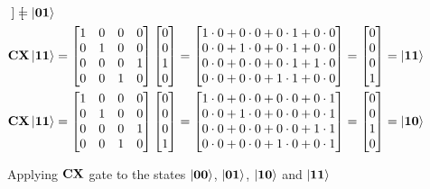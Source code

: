 \begin{figure}[H]
\begin{align*}
\begin{bmatrix}
        \end{bmatrix}
        =\ket{\mathbf{0}\mathbf{1}}\\
        \mathbf{CX}\ket{\mathbf{1}\mathbf{1}}&=\begin{bmatrix} 1 & 0 & 0 & 0\\ 0 & 1 & 0 & 0\\ 0 & 0 & 0 & 1\\ 0 & 0 & 1 & 0\\ \end{bmatrix}
        \begin{bmatrix}
            0\\
            0\\
            1\\
            0\\
        \end{bmatrix}
        =
        \begin{bmatrix}
            1\cdot 0 + 0\cdot 0 + 0\cdot 1 + 0\cdot 0\\
            0\cdot 0 + 1\cdot 0 + 0\cdot 1 + 0\cdot 0\\
            0\cdot 0 + 0\cdot 0 + 0\cdot 1 + 1\cdot 0\\
            0\cdot 0 + 0\cdot 0 + 1\cdot 1 + 0\cdot 0\\
        \end{bmatrix}=
        \begin{bmatrix}
            0\\
            0\\
            0\\
            1\\
        \end{bmatrix}
        =\ket{\mathbf{1}\mathbf{1}}\\
        \mathbf{CX}\ket{\mathbf{1}\mathbf{1}}&=\begin{bmatrix} 1 & 0 & 0 & 0\\ 0 & 1 & 0 & 0\\ 0 & 0 & 0 & 1\\ 0 & 0 & 1 & 0\\ \end{bmatrix}
        \begin{bmatrix}
            0\\
            0\\
            0\\
            1\\
        \end{bmatrix}
        =
        \begin{bmatrix}
            1\cdot 0 + 0\cdot 0 + 0\cdot 0 + 0\cdot 1\\
            0\cdot 0 + 1\cdot 0 + 0\cdot 0 + 0\cdot 1\\
            0\cdot 0 + 0\cdot 0 + 0\cdot 0 + 1\cdot 1\\
            0\cdot 0 + 0\cdot 0 + 1\cdot 0 + 0\cdot 1\\
        \end{bmatrix}=
        \begin{bmatrix}
            0\\
            0\\
            1\\
            0\\
        \end{bmatrix}
        =\ket{\mathbf{1}\mathbf{0}}
    \end{align*}
    \caption{Applying $\mathbf{CX}$ gate to the states $\ket{\mathbf{0}\mathbf{0}}$, $\ket{\mathbf{0}\mathbf{1}}$, $\ket{\mathbf{1}\mathbf{0}}$ and $\ket{\mathbf{1}\mathbf{1}}$}
    \label{fig:cx}
\end{figure}

